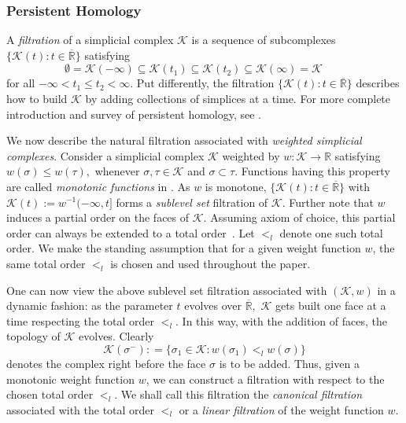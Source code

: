 \documentclass[12pt]{amsart}
\numberwithin{equation}{section}
\numberwithin{theorem}{section}
\newcommand{\Real}{\mathbb R}
\newcommand{\1}{\mathbf{1}}
\def\K{\mathcal{K}}
\begin{document}
\subsubsection{Persistent Homology}
\label{sec:PersistentHomology}

A \emph{filtration} of a simplicial complex $\K$ is a sequence of subcomplexes $\{\K(t) : t \in \overline{\Real}\}$ satisfying
%
\begin{equation*}
\emptyset = \K(-\infty) \subseteq \K(t_1) \subseteq \K(t_2) \subseteq \K(\infty) = \K \qquad
\end{equation*}
%
for all $ -\infty < t_1  \leq t_2 < \infty.$ Put differently, the filtration $\{\K(t): t \in \overline{\Real}\}$ describes how to build $\K$ by adding collections of  simplices at a time. For more complete introduction and survey of persistent homology, see \cite{Edelsbrunner10,Carlsson09,Carlsson14}.

We now describe the natural filtration associated with \emph{weighted simplicial complexes}. Consider a simplicial complex $\K$ weighted by $w: \K \to \Real$ satisfying $w(\sigma) \leq w(\tau),$ whenever $\sigma, \tau \in \K$ and $\sigma \subset \tau.$ Functions having this property are called {\em monotonic functions} in \cite[Chapter VIII]{Edelsbrunner10}. As $w$ is monotone, $\{\K(t) : t \in \overline{\Real}\}$ with $ \K(t) := w^{-1}(-\infty, t]$ forms a \emph{sublevel set} filtration of $\K.$ Further note that $w$ induces a partial order on the faces of $\K.$ Assuming axiom of choice, this partial order can always be extended to a total order~\cite{szpilrajn1930extension}. Let $<_l$ denote one such total order. We make the standing assumption that for a given weight function $w$, the same total order $<_l$ is chosen and used throughout the paper.

One can now view the above sublevel set filtration associated with $(\K, w)$ in a dynamic fashion: as the parameter $t$ evolves over $\overline{\Real},$ $\K$ gets built one face at a time respecting the total order $<_l.$ In this way, with the addition of faces, the topology of $\K$ evolves. Clearly
%
\begin{equation}\label{eq:definition_minus}
\K(\sigma^-) : = \{\sigma_1 \in \K: w(\sigma_1) <_l w(\sigma)\}
\end{equation}
%
denotes the complex right before the face $\sigma$ is to be added. Thus, given a monotonic weight function $w$, we can construct a filtration with respect to the chosen total order $<_l$. We shall call this filtration the {\em canonical filtration} associated with the total order $<_l$ or a {\em linear filtration} 	of the weight function $w$.
\end{document}
